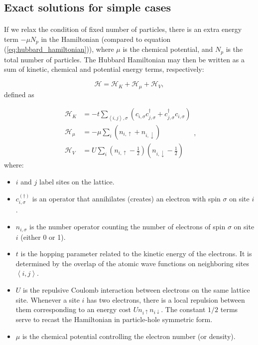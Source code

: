 \documentclass[10pt, twocolumn, twoside]{article}
\begin{document}
\subsection{Exact solutions for simple cases}\label{exactSolutions}\paragraph{}

If we relax the condition of fixed number of particles, there is an extra energy term $-\mu N_p$ in the Hamiltonian (compared to equation (\ref{eq:hubbard_hamiltonian})), where $\mu$ is the chemical potential, and $N_p$ is the total number of particles. The Hubbard Hamiltonian may then be written as a sum of kinetic, chemical and potential energy terms, respectively:

\begin{equation}\label{eq:hubbard}
\mathcal{H} = \mathcal{H}_K + \mathcal{H}_\mu + \mathcal{H}_V ,
\end{equation}
defined as

\begin{equation}\label{eq:def_energies}
\begin{split}
\mathcal{H}_K &= -t \sum_{\left\langle i, j \right \rangle, \sigma} ( c_{i,\sigma} c_{j,\sigma}^\dagger + c_{j,\sigma}^\dagger c_{i,\sigma} ) \\
\mathcal{H}_\mu &= -\mu \sum_i ( n_{i,\uparrow} + n_{i,\downarrow} ) \\
\mathcal{H}_V &= U \sum_{i} ( n_{i,\uparrow} - \frac{1}{2} ) ( n_{i,\downarrow} - \frac{1}{2} )
\end{split} ,
\end{equation}
where:

\begin{itemize}
\item $i$ and $j$ label sites on the lattice.
\item $c_{i,\sigma}^{(\dagger)}$ is an operator that annihilates (creates) an electron with spin $\sigma$ on site $i$.
\item $n_{i,\sigma}$ is the number operator counting the number of electrons of spin $\sigma$ on site $i$ (either 0 or 1).
\item $t$ is the hopping parameter related to the kinetic energy of the electrons. It is determined by the overlap of the atomic wave functions on neighboring sites $\left\langle i, j \right\rangle$.
\item $U$ is the repulsive Coulomb interaction between electrons on the same lattice site. Whenever a site $i$ has two electrons, there is a local repulsion between them corresponding to an energy cost $U n_{i \uparrow} n_{i \downarrow}$. The constant $1/2$ terms serve to recast the Hamiltonian in particle-hole symmetric form.
\item $\mu$ is the chemical potential controlling the electron number (or density).
\end{itemize}
\end{document}
